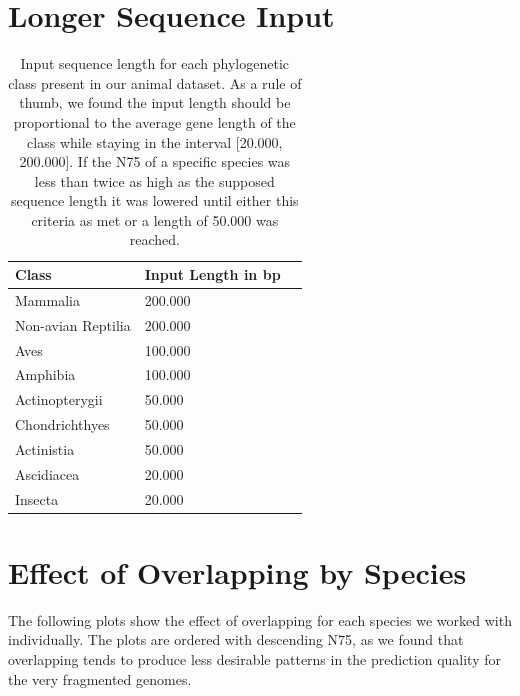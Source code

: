 \documentclass{article}
\renewcommand{\thetable}{S\arabic{table}}
\begin{document}
\newpage
\section{Longer Sequence Input}
\label{sec:longer}
\begin{table}[!h]
\centering
\begin{tabular}{@{}lll@{}}
\hline
Class & Input Length in bp\\ [0.5ex]
\hline
Mammalia & 200.000 \\
Non-avian Reptilia & 200.000 \\
Aves & 100.000 \\
Amphibia & 100.000 \\
Actinopterygii & 50.000 \\
Chondrichthyes & 50.000 \\
Actinistia & 50.000 \\
Ascidiacea & 20.000 \\
Insecta & 20.000 \\
\hline
\end{tabular}
\caption{Input sequence length for each phylogenetic class present in our animal dataset. As a rule of thumb, we found the input length should be proportional to the average gene length of the class while staying in the interval [20.000, 200.000]. If the N75 of a specific species was less than twice as high as the supposed sequence length it was lowered until either this criteria as met or a length of 50.000 was reached. }
\label{suptab:prediction_lengths}
\end{table}

\newpage
\section{Effect of Overlapping by Species}
\label{sec:overlapping}

The following plots show the effect of overlapping for each species we worked with individually. The plots are ordered with descending N75, as we found that overlapping tends to produce less desirable patterns in the prediction quality for the very fragmented genomes. 
\end{document}
